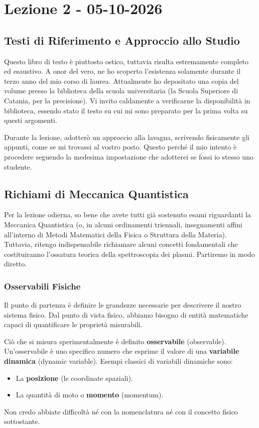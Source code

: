 \chapter{Lezione 2 - 05-10-2026}

\section{Testi di Riferimento e Approccio allo Studio}

Questo libro di testo è piuttosto ostico, tuttavia risulta estremamente completo ed esaustivo. A onor del vero, ne ho scoperto l'esistenza solamente durante il terzo anno del mio corso di laurea. Attualmente ho depositato una copia del volume presso la biblioteca della scuola universitaria (la Scuola Superiore di Catania, per la precisione). Vi invito caldamente a verificarne la disponibilità in biblioteca, essendo stato il testo su cui mi sono preparato per la prima volta su questi argomenti.

Durante la lezione, adotterò un approccio alla lavagna, scrivendo fisicamente gli appunti, come se mi trovassi al vostro posto. Questo perché il mio intento è procedere seguendo la medesima impostazione che adotterei se fossi io stesso uno studente.

\section{Richiami di Meccanica Quantistica}

Per la lezione odierna, so bene che avete tutti già sostenuto esami riguardanti la Meccanica Quantistica (o, in alcuni ordinamenti triennali, insegnamenti affini all'interno di Metodi Matematici della Fisica o Struttura della Materia). Tuttavia, ritengo indispensabile richiamare alcuni concetti fondamentali che costituiranno l'ossatura teorica della spettroscopia dei plasmi. Partiremo in modo diretto.

\subsection{Osservabili Fisiche}

Il punto di partenza è definire le grandezze necessarie per descrivere il nostro sistema fisico. Dal punto di vista fisico, abbiamo bisogno di entità matematiche capaci di quantificare le proprietà misurabili.

Ciò che si misura sperimentalmente è definito \textbf{osservabile} (observable).
Un'osservabile è uno specifico numero che esprime il valore di una \textbf{variabile dinamica} (dynamic variable). Esempi classici di variabili dinamiche sono:
\begin{itemize}
\item La \textbf{posizione} (le coordinate spaziali).
\item La quantità di moto o \textbf{momento} (momentum).
\end{itemize}
Non credo abbiate difficoltà né con la nomenclatura né con il concetto fisico sottostante.

